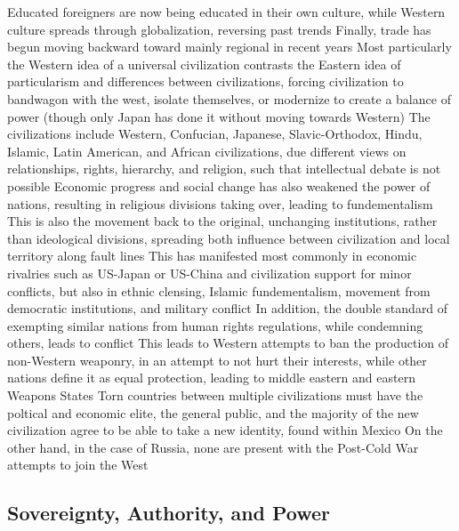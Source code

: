 \documentclass[11 pt, twoside]{article}
\newenvironment{outline*}
{
	\begin{outline}[enumerate]
	}
	{\end{outline}
}
\begin{document}
\begin{outline*}
\3 Educated foreigners are now being educated in their own culture, while Western culture spreads through globalization, reversing past trends
\3 Finally, trade has begun moving backward toward mainly regional in recent years
\3 Most particularly the Western idea of a universal civilization contrasts the Eastern idea of particularism and differences between civilizations, forcing civilization to bandwagon with the west, isolate themselves, or modernize to create a balance of power (though only Japan has done it without moving towards Western)
\2 The civilizations include Western, Confucian, Japanese, Slavic-Orthodox, Hindu, Islamic, Latin American, and African civilizations, due different views on relationships, rights, hierarchy, and religion, such that intellectual debate is not possible
\2 Economic progress and social change has also weakened the power of nations, resulting in religious divisions taking over, leading to fundementalism
\2 This is also the movement back to the original, unchanging institutions, rather than ideological divisions, spreading both influence between civilization and local territory along fault lines
\2 This has manifested most commonly in economic rivalries such as US-Japan or US-China and civilization support for minor conflicts, but also in ethnic clensing, Islamic fundementalism, movement from democratic institutions, and military conflict
\3 In addition, the double standard of exempting similar nations from human rights regulations, while condemning others, leads to conflict
\3 This leads to Western attempts to ban the production of non-Western weaponry, in an attempt to not hurt their interests, while other nations define it as equal protection, leading to middle eastern and eastern Weapons States
\2 Torn countries between multiple civilizations must have the poltical and economic elite, the general public, and the majority of the new civilization agree to be able to take a new identity, found within Mexico
\3 On the other hand, in the case of Russia, none are present with the Post-Cold War attempts to join the West
\end{outline*}

\subsection{Sovereignty, Authority, and Power}
\end{document}
